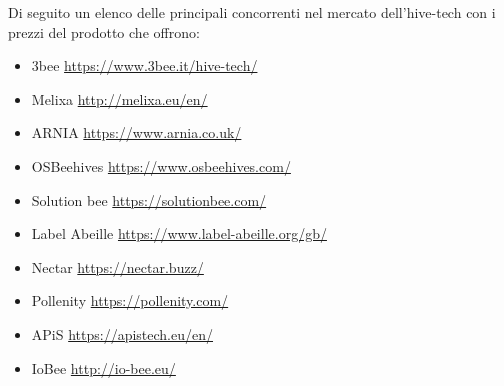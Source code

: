Di seguito un elenco delle principali concorrenti nel mercato dell’hive-tech con
i prezzi del prodotto che offrono:
\begin{itemize}
\item 3bee   \url{https://www.3bee.it/hive-tech/} 
\item Melixa \url{http://melixa.eu/en/} 
\item ARNIA  \url{https://www.arnia.co.uk/}  
\item OSBeehives \url{https://www.osbeehives.com/}    
\item Solution bee \url{https://solutionbee.com/} 
\item Label Abeille \url{https://www.label-abeille.org/gb/} 
\item Nectar \url{https://nectar.buzz/}  
\item Pollenity \url{https://pollenity.com/} 
\item APiS \url{https://apistech.eu/en/}
\item IoBee \url{http://io-bee.eu/}
\end{itemize}
